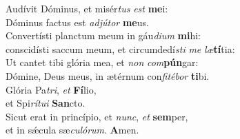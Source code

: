 \oddverse Audívit Dóminus, et misér\textit{tus} \textit{est} \textbf{me}i:~\*\\
\oddverse Dóminus factus est \textit{ad}\textit{jú}\textit{tor} \textbf{me}us.\\
\evenverse Convertísti planctum meum in gáu\textit{di}\textit{um} \textbf{mi}hi:~\*\\
\evenverse conscidísti saccum meum, et circumdedí\textit{sti} \textit{me} \textit{læ}\textbf{tí}tia:\\
\oddverse Ut cantet tibi glória mea, et \textit{non} \textit{com}\textbf{pún}gar:~\*\\
\oddverse Dómine, Deus meus, in ætérnum con\textit{fi}\textit{té}\textit{bor} \textbf{ti}bi.\\
\evenverse Glória Pa\textit{tri}, \textit{et} \textbf{Fí}lio,~\*\\
\evenverse et Spi\textit{rí}\textit{tu}\textit{i} \textbf{San}cto.\\
\oddverse Sicut erat in princípio, et \textit{nunc}, \textit{et} \textbf{sem}per,~\*\\
\oddverse et in sǽcula sæ\textit{cu}\textit{ló}\textit{rum}. \textbf{A}men.\\
